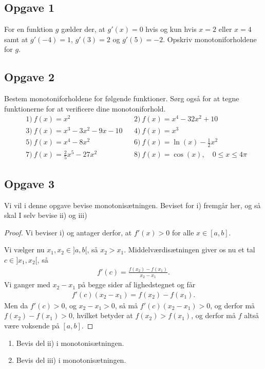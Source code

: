 \subsection*{Opgave 1}
For en funktion $g$ gælder der, at $g'(x) = 0$ hvis og kun hvis $x = 2$ eller $x = 4$ samt at $g'(-4) = 1$, $g'(3) = 2$ og $g'(5) = -2$. Opskriv monotoniforholdene for $g$.

\subsection*{Opgave 2}
Bestem monotoniforholdene for følgende funktioner. Sørg også for at tegne funktionerne for at verificere dine monotoniforhold. 
\begin{align*}
&1) \ f(x) = x^2   &&2)\  f(x) = x^4 - 32x^2 + 10 \\
&3) \ f(x) = x^3 - 3x^2 - 9x -10 &&4)\ f(x) = x^3 \\
&5) \ f(x) = x^4-8x^2 &&6)\ f(x) = \ln(x) -\frac{1}{2}x^2 \\
&7) \ f(x) = \frac{2}{5}x^5-27x^2  &&8)\ f(x) =  \cos(x), \quad 0 \leq x \leq 4\pi
\end{align*}

\subsection*{Opgave 3}
Vi vil i denne opgave bevise monotonisætningen. Beviset for i) fremgår her, og så skal I selv bevise ii) og iii)
\begin{proof}
	Vi beviser i) og antager derfor, at $f'(x) > 0$ for alle $x \in [a,b]$.
	
	Vi vælger nu $x_1, x_2 \in ]a,b[$, så $x_2 > x_1$. Middelværdisætningen giver os nu et tal $c \in ]x_1,x_2[$, så
	\begin{align*}
		f'(c) = \frac{f(x_2)-f(x_1)}{x_2-x_1}.
	\end{align*}
	Vi ganger med $x_2 - x_1$ på begge sider af lighedstegnet og får
	\begin{align*}
		f'(c)(x_2 - x_1) = f(x_2) - f(x_1).
	\end{align*}
	Men da $f'(c) > 0$, og $x_2 - x_1 > 0$, så må $f'(c)(x_2 - x_1) > 0$, og derfor må $f(x_2) - f(x_1) > 0$, hvilket betyder at $f(x_2) > f(x_1)$, og derfor må $f$ altså være voksende på $[a,b]$. 
\end{proof}
\begin{enumerate}[label= \Roman*)]	
	\item Bevis del ii) i monotonisætningen.
	\item Bevis del iii) i monotonisætningen. 
\end{enumerate}

